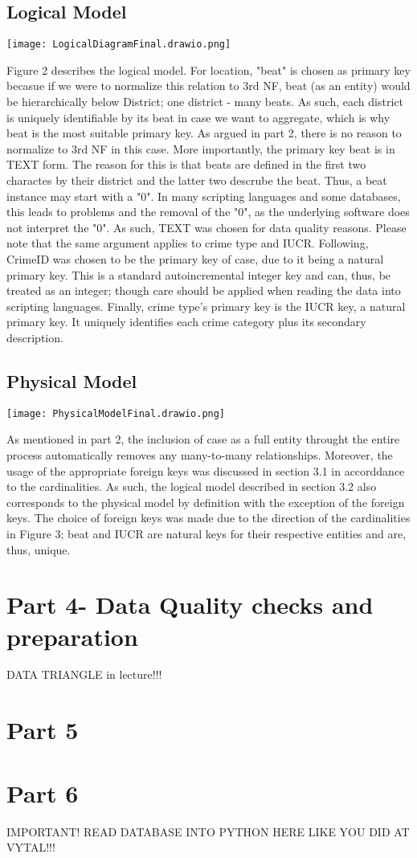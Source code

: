 \documentclass[a4paper]{article}
\begin{document}
\subsection{Logical Model}
\texttt{[image: LogicalDiagramFinal.drawio.png]}


Figure 2 describes the logical model. For location, "beat" is chosen as primary key becasue if we were to normalize this relation to 3rd NF, beat (as an entity) would be hierarchically below District; one district - many beats. As such, each district is uniquely identifiable by its beat in case we want to aggregate, which is why beat is the most suitable primary key. As argued in part 2, there is no reason to normalize to 3rd NF in this case. More importantly, the primary key beat is in TEXT form. The reason for this is that beats are defined in the first two charactes by their district and the latter two descrube the beat. Thus, a beat instance may start with a "0". In many scripting languages and some databases, this leads to problems and the removal of the "0", as the underlying software does not interpret the "0". As such, TEXT was chosen for data quality reasons. Please note that the same argument applies to crime type and IUCR. 
\indent Following, CrimeID was chosen to be the primary key of case, due to it being a natural primary key. This is a standard autoincremental integer key and can, thus, be treated as an integer; though care should be applied when reading the data into scripting languages.
\indent Finally, crime type's primary key is the IUCR key, a natural primary key. It uniquely identifies each crime category plus its secondary description. 

\subsection{Physical Model}
\texttt{[image: PhysicalModelFinal.drawio.png]}

As mentioned in part 2, the inclusion of case as a full entity throught the entire process automatically removes any many-to-many relationships. Moreover, the usage of the appropriate foreign keys was discussed in section 3.1 in accorddance to the cardinalities. As such, the logical model described in section 3.2 also corresponds to the physical model by definition with the exception of the foreign keys. The choice of foreign keys was made due to the direction of the cardinalities in Figure 3; beat and IUCR are natural keys for their respective entities and are, thus, unique.



\section{Part 4- Data Quality checks and preparation}


DATA TRIANGLE in lecture!!!

\section{Part 5}






\section{Part 6}
IMPORTANT! READ DATABASE INTO PYTHON HERE LIKE YOU DID AT VYTAL!!!
\end{document}
